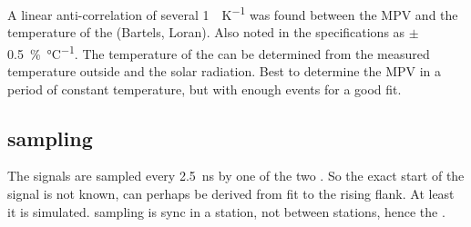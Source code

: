 A linear anti-correlation of several \SI{1}{\adc\per\kelvin} was found
between the MPV and the temperature of the \pmt (Bartels, Loran). Also
noted in the specifications as $\pm$
\SI{.5}{\percent\per\degreeCelsius}. The temperature of the \pmt can be
determined from the measured temperature outside and the solar
radiation. Best to determine the MPV in a period of constant
temperature, but with enough events for a good fit.


\subsection{\adc sampling}

The \pmt signals are sampled every \SI{2.5}{\nano\second} by one of the
two \adcs. So the exact start of the signal is not known, can perhaps be
derived from fit to the rising flank. At least it is simulated. sampling
is sync in a station, not between stations, hence the \gps.
